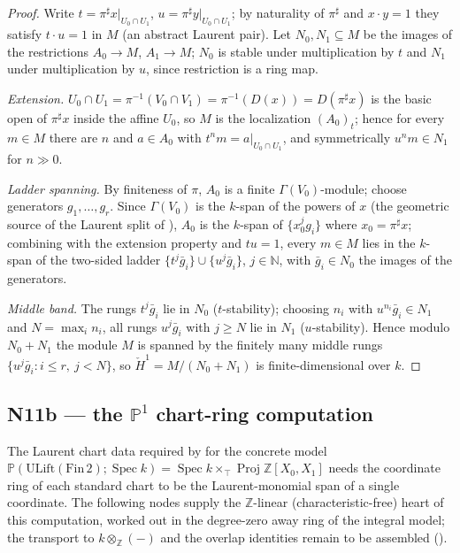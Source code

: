 \begin{proof}
  \leanok
  Write \(t = \pi^{\sharp} x|_{U_0 \cap U_1}\),
  \(u = \pi^{\sharp} y|_{U_0 \cap U_1}\); by naturality of \(\pi^{\sharp}\)
  and \(x \cdot y = 1\) they satisfy \(t \cdot u = 1\) in \(M\) (an
  abstract Laurent pair). Let \(N_0, N_1 \subseteq M\) be the images of
  the restrictions \(A_0 \to M\), \(A_1 \to M\); \(N_0\) is stable under
  multiplication by \(t\) and \(N_1\) under multiplication by \(u\),
  since restriction is a ring map.

  \emph{Extension.} \(U_0 \cap U_1 = \pi^{-1}(V_0 \cap V_1) =
  \pi^{-1}(D(x)) = D(\pi^{\sharp} x)\) is the basic open of
  \(\pi^{\sharp} x\) inside the affine \(U_0\), so \(M\) is the
  localization \((A_0)_t\); hence for every \(m \in M\) there are \(n\)
  and \(a \in A_0\) with \(t^n m = a|_{U_0 \cap U_1}\), and symmetrically
  \(u^n m \in N_1\) for \(n \gg 0\).

  \emph{Ladder spanning.} By finiteness of \(\pi\), \(A_0\) is a finite
  \(\Gamma(V_0)\)-module; choose generators \(g_1, \dots, g_r\). Since
  \(\Gamma(V_0)\) is the \(k\)-span of the powers of \(x\) (the geometric
  source of the Laurent split of ),
  \(A_0\) is the \(k\)-span of \(\{x_0^j g_i\}\) where
  \(x_0 = \pi^{\sharp} x\); combining with the extension property and
  \(tu = 1\), every \(m \in M\) lies in the \(k\)-span of the two-sided
  ladder \(\{t^j \bar{g}_i\} \cup \{u^j \bar{g}_i\}\), \(j \in
  \mathbb{N}\), with \(\bar{g}_i \in N_0\) the images of the generators.

  \emph{Middle band.} The rungs \(t^j \bar{g}_i\) lie in \(N_0\)
  (\(t\)-stability); choosing \(n_i\) with \(u^{n_i} \bar{g}_i \in N_1\)
  and \(N = \max_i n_i\), all rungs \(u^j \bar{g}_i\) with \(j \ge N\) lie
  in \(N_1\) (\(u\)-stability). Hence modulo \(N_0 + N_1\) the module
  \(M\) is spanned by the finitely many middle rungs
  \(\{u^j \bar{g}_i : i \le r,\ j < N\}\), so
  \(\check{H}^1 = M/(N_0 + N_1)\) is finite-dimensional over \(k\).
\end{proof}

\subsection{N11b --- the \(\mathbb{P}^1\) chart-ring computation}
\label{sec:RiemannRoch_Adelic_P1ChartData}

The Laurent chart data required by
 for the concrete model
\(\mathbb{P}(\mathrm{ULift}(\mathrm{Fin}\,2); \operatorname{Spec} k) =
\operatorname{Spec} k \times_{\top} \operatorname{Proj}\mathbb{Z}[X_0,
X_1]\) needs the coordinate ring of each standard chart to be the
Laurent-monomial span of a single coordinate. The following nodes supply
the \(\mathbb{Z}\)-linear (characteristic-free) heart of this
computation, worked out in the degree-zero away ring of the integral
model; the transport to \(k \otimes_{\mathbb{Z}} (-)\) and the overlap
identities remain to be assembled ().

